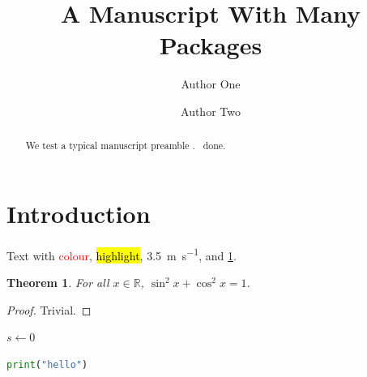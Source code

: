 \documentclass[11pt]{article}
\title{A Manuscript With Many Packages}
\author{Author One \and Author Two}
\newtheorem{theorem}{Theorem}
\newcommand{\cmark}{\ding{51}}
\begin{document}
\maketitle
\begin{abstract}
We test a typical manuscript preamble \cite{knuth84}. \cmark\ done.
\end{abstract}
\section{Introduction}\label{sec:intro}
Text with \textcolor{red}{colour}, \hl{highlight}, \SI{3.5}{\meter\per\second}, and \cref{sec:intro}.
\begin{theorem}\label{thm:a} For all $x\in\mathbb{R}$, $\sin^2 x+\cos^2 x=1$. \end{theorem}
\begin{proof} Trivial. \end{proof}
\begin{algorithm}[H]
$s \gets 0$\;
\caption{Sum}
\end{algorithm}
\begin{lstlisting}[language=Python]
print("hello")
\end{lstlisting}


\end{document}
